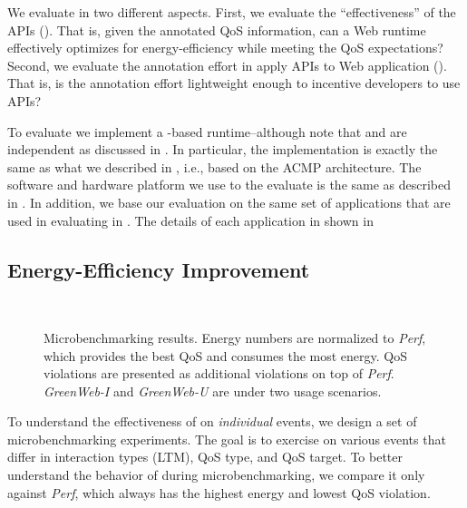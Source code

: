 We evaluate \greenweb in two different aspects. First, we evaluate the ``effectiveness'' of the \greenweb APIs (). That is, given the annotated QoS information, can a Web runtime effectively optimizes for energy-efficiency while meeting the QoS expectations? Second, we evaluate the annotation effort in apply \greenweb APIs to Web application (). That is, is the annotation effort lightweight enough to incentive developers to use \greenweb APIs?

To evaluate \greenweb we implement a \webrt-based \greenweb runtime--although note that \webrt and \greenweb are independent as discussed in . In particular, the \webrt implementation is exactly the same as what we described in , i.e., based on the ACMP architecture. The software and hardware platform we use to the evaluate \greenweb is the same as described in . In addition, we base our evaluation on the same set of applications that are used in evaluating \ebs in . The details of each application in shown in 



\subsection{Energy-Efficiency Improvement}
\label{sec:lang:eval:effect}

\begin{figure}[p]
\centering
{}\\
\vspace*{25pt}
\caption{Microbenchmarking results. Energy numbers are normalized to \textit{Perf}, which provides the best QoS and consumes the most energy. QoS violations are presented as additional violations on top of \textit{Perf}. \textit{GreenWeb-I} and \textit{GreenWeb-U} are \greenweb under two usage scenarios.}
\label{fig:ubenchmark_results}
\end{figure}

To understand the effectiveness of \greenweb on \textit{individual} events, we design a set of microbenchmarking experiments. The goal is to exercise \greenweb on various events that differ in interaction types (LTM), QoS type, and QoS target. To better understand the behavior of \greenweb during microbenchmarking, we compare it only against \textit{Perf}, which always has the highest energy and lowest QoS violation.

